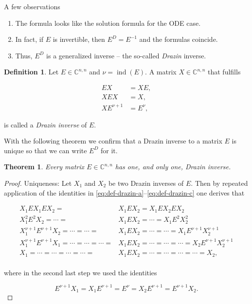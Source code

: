 \documentclass[]{book}
\providecommand{\tightlist}{%
  \setlength{\itemsep}{0pt}\setlength{\parskip}{0pt}}
\newtheorem{theorem}{Theorem}[chapter]
\theoremstyle{definition}
\newtheorem{definition}{Definition}[chapter]
\theoremstyle{definition}
\theoremstyle{definition}
\theoremstyle{definition}
\theoremstyle{remark}
\begin{document}
A few observations

\begin{enumerate}
\def\labelenumi{\arabic{enumi}.}
\tightlist
\item
  The formula looks like the solution formula for the ODE case.
\item
  In fact, if \(E\) is invertible, then \(E^{D}=E^{-1}\) and the formulas coincide.
\item
  Thus, \(E^D\) is a generalized inverse -- the so-called \emph{Drazin} inverse.
\end{enumerate}

\begin{definition}
\protect\hypertarget{def:drazin-inverse}{}{\label{def:drazin-inverse} }
Let \(E\in \mathbb C^{n,n}\) and \(\nu = \operatorname{ind}(E)\). A matrix \(X\in \mathbb C^{n,n}\) that fulfills

\begin{align}
    EX & = XE, \label{eq:def-drazin-a} \\
    XEX & = X, \label{eq:def-drazin-b} \\
    XE^{\nu+1} & = E^{\nu}, \label{eq:def-drazin-c}
\end{align}

is called a \emph{Drazin inverse} of \(E\).
\end{definition}

With the following theorem we confirm that a Drazin inverse to a matrix \(E\) is unique so that we can write \(E^D\) for it.

\begin{theorem}
\protect\hypertarget{thm:drazin-inverse-unique}{}{\label{thm:drazin-inverse-unique} }
Every matrix \(E\in\mathbb{C}^{n,n}\) has one, and only one, Drazin inverse.
\end{theorem}

\begin{proof}
{}Uniqueness: Let \(X_1\) and \(X_2\) be two Drazin inverses of \(E\). Then by repeated application of the identities in \eqref{eq:def-drazin-a}--\eqref{eq:def-drazin-c} one derives that

\begin{align*}
X_1 EX_1 E X_2 =   &X_1EX_2 = X_1EX_2EX_2  \\
X_1^2 E^2 X_2 = \dotsm=   &X_1EX_2 = \dotsm= X_1E^2X_2^2  \\
X_1^{\nu+1}E^{\nu+1} X_2 =\dotsm=\dotsm=   &X_1EX_2 =\dotsm=\dotsm= X_1E^{\nu+1}X_2^{\nu+1}  \\
X_1^{\nu+1}E^{\nu+1} X_1 =\dotsm=\dotsm=\dotsm=   &X_1EX_2 =\dotsm=\dotsm=\dotsm= X_2E^{\nu+1}X_2^{\nu+1}  \\
X_1 =\dotsm=\dotsm=\dotsm=\dotsm=   &X_1EX_2 =\dotsm=\dotsm=\dotsm=\dotsm= X_2, \\
\end{align*}

where in the second last step we used the identities

\[
    E^{\nu+1}X_1=X_1E^{\nu+1}=E^{\nu}=X_2E^{\nu+1}=E^{\nu+1}X_2.
\]
\end{proof}
\end{document}

